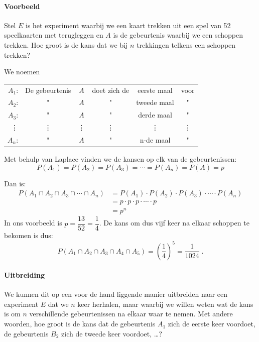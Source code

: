 \documentclass[12pt,twoside]{article}
\begin{document}
\paragraph*{Voorbeeld}
Stel $E$ is het experiment waarbij we een kaart trekken uit een spel van 52 speelkaarten met terugleggen en $A$ is de gebeurtenis waarbij we een schoppen trekken.
Hoe groot is de kans dat we bij $n$ trekkingen telkens een schoppen trekken?

We noemen
\begin{center}
  \renewcommand{\arraystretch}{1}
  \begin{tabular}{r@{ }c@{ }c@{ }c@{ }c@{ }c}
    $A_1$: & De gebeurtenis & $A$ & doet zich de & eerste maal & voor\\
    $A_2$: &        "       & $A$ &       "      & tweede maal &   " \\
    $A_3$: &        "       & $A$ &       "      & derde maal &   " \\
    \vdots &    \vdots      & \vdots &  \vdots   &  \vdots  &\vdots \\
    $A_n$: &        "       & $A$ &       "      & n-de maal &   " \\
  \end{tabular}
\end{center}

Met behulp van Laplace vinden we de kansen op elk van de gebeurtenissen:
$$P(A_1)=P(A_2)=P(A_3)=\cdots=P(A_n)=P(A)=p$$

Dan is:
\begin{align*}
  P(A_1\cap A_2 \cap A_3\cap \cdots \cap A_n)&=P(A_1)\cdot P(A_2)\cdot P(A_3)\cdot \cdots \cdot P(A_n)\\
                                             &=p\cdot p\cdot p\cdot \cdots \cdot p\\
                                             &= p^n
\end{align*}
In ons voorbeeld is $p=\dfrac{13}{52}=\dfrac{1}{4}$. De kans om dus vijf keer na elkaar schoppen te bekomen is dus:
$$P(A_1\cap A_2 \cap A_3\cap A_4 \cap A_5)=\left(\dfrac{1}{4}\right)^5=\dfrac{1}{1024}\;.$$

\paragraph*{Uitbreiding} We kunnen dit op een voor de hand liggende manier uitbreiden naar een experiment $E$ dat we $n$ keer herhalen, maar waarbij we willen weten wat de kans is om $n$ verschillende gebeurtenissen na elkaar waar te nemen. Met andere woorden, hoe groot is de kans dat de gebeurtenis $A_1$ zich de eerste keer voordoet, de gebeurtenis $B_2$ zich de tweede keer voordoet, \ldots?
\end{document}
